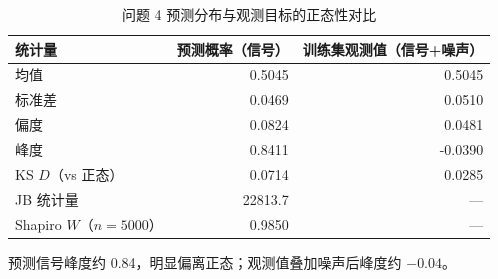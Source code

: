 \begin{table}[htbp]
\centering
\caption{问题 4 预测分布与观测目标的正态性对比}
\label{tab:normality}
\small
\begin{tabular}{lrr}
\toprule
统计量 & 预测概率（信号） & 训练集观测值（信号+噪声） \\
\midrule
均值 & 0.5045 & 0.5045 \\
标准差 & 0.0469 & 0.0510 \\
偏度 & 0.0824 & 0.0481 \\
峰度 & 0.8411 & -0.0390 \\
KS $D$（vs 正态） & 0.0714 & 0.0285 \\
JB 统计量 & 22813.7 & — \\
Shapiro $W$（$n=5000$） & 0.9850 & — \\
\bottomrule
\end{tabular}
\par\vspace{2pt}\footnotesize 预测信号峰度约 0.84，明显偏离正态；观测值叠加噪声后峰度约 $-0.04$。
\end{table}
